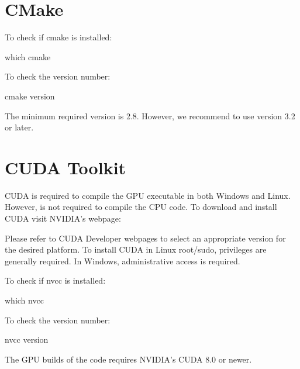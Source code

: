 \documentclass[letterpaper,10pt,english]{sphinxmanual}
\begin{document}
\section{CMake}
\label{\detokenize{software_requirements:cmake}}
To check if cmake is installed:

\begin{sphinxVerbatim}[commandchars=\\\{\}]
\PYGZdl{} which cmake
\end{sphinxVerbatim}

To check the version number:

\begin{sphinxVerbatim}[commandchars=\\\{\}]
\PYGZdl{} cmake \PYGZhy{}\PYGZhy{}version
\end{sphinxVerbatim}

The minimum required version is 2.8. However, we recommend to use version 3.2 or later.


\section{CUDA Toolkit}
\label{\detokenize{software_requirements:cuda-toolkit}}
CUDA is required to compile the GPU executable in both Windows and Linux. However, is not required to compile the CPU code. To download and install CUDA visit NVIDIA’s webpage:



Please refer to CUDA Developer webpages to select an appropriate version for the desired platform. To install CUDA in Linux root/sudo, privileges are generally required. In Windows, administrative access is required.

To check if nvcc is installed:

\begin{sphinxVerbatim}[commandchars=\\\{\}]
\PYGZdl{} which nvcc
\end{sphinxVerbatim}

To check the version number:

\begin{sphinxVerbatim}[commandchars=\\\{\}]
\PYGZdl{} nvcc \PYGZhy{}\PYGZhy{}version
\end{sphinxVerbatim}

The GPU builds of the code requires NVIDIA’s CUDA 8.0 or newer.
\end{document}
